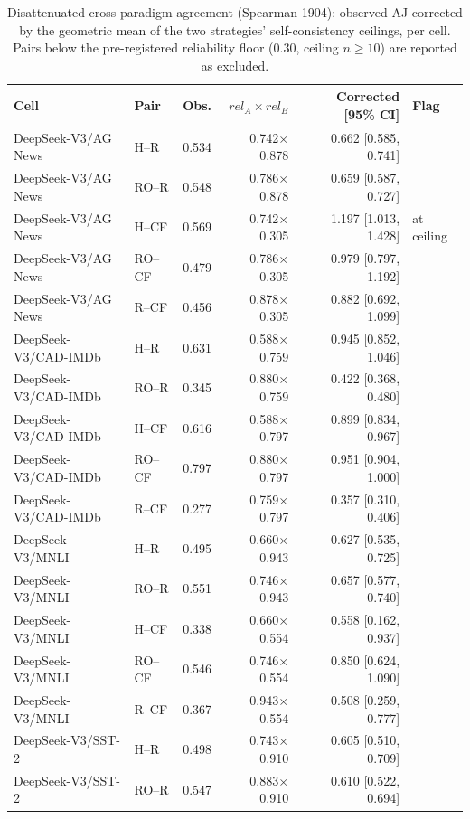 \begin{table}[t]
\centering
\footnotesize
\caption{Disattenuated cross-paradigm agreement (Spearman 1904): observed AJ corrected by the geometric mean of the two strategies' self-consistency ceilings, per cell. Pairs below the pre-registered reliability floor (0.30, ceiling $n \geq 10$) are reported as excluded.}
\label{tab:disattenuated}
\begin{tabular}{llrrrl}
\toprule
Cell & Pair & Obs. & $rel_A{\times}rel_B$ & Corrected [95\% CI] & Flag \\
\midrule
DeepSeek-V3/AG News & H--R & 0.534 & 0.742$\times$0.878 & 0.662 [0.585, 0.741] &  \\
DeepSeek-V3/AG News & RO--R & 0.548 & 0.786$\times$0.878 & 0.659 [0.587, 0.727] &  \\
DeepSeek-V3/AG News & H--CF & 0.569 & 0.742$\times$0.305 & 1.197 [1.013, 1.428] & at ceiling \\
DeepSeek-V3/AG News & RO--CF & 0.479 & 0.786$\times$0.305 & 0.979 [0.797, 1.192] &  \\
DeepSeek-V3/AG News & R--CF & 0.456 & 0.878$\times$0.305 & 0.882 [0.692, 1.099] &  \\
DeepSeek-V3/CAD-IMDb & H--R & 0.631 & 0.588$\times$0.759 & 0.945 [0.852, 1.046] &  \\
DeepSeek-V3/CAD-IMDb & RO--R & 0.345 & 0.880$\times$0.759 & 0.422 [0.368, 0.480] &  \\
DeepSeek-V3/CAD-IMDb & H--CF & 0.616 & 0.588$\times$0.797 & 0.899 [0.834, 0.967] &  \\
DeepSeek-V3/CAD-IMDb & RO--CF & 0.797 & 0.880$\times$0.797 & 0.951 [0.904, 1.000] &  \\
DeepSeek-V3/CAD-IMDb & R--CF & 0.277 & 0.759$\times$0.797 & 0.357 [0.310, 0.406] &  \\
DeepSeek-V3/MNLI & H--R & 0.495 & 0.660$\times$0.943 & 0.627 [0.535, 0.725] &  \\
DeepSeek-V3/MNLI & RO--R & 0.551 & 0.746$\times$0.943 & 0.657 [0.577, 0.740] &  \\
DeepSeek-V3/MNLI & H--CF & 0.338 & 0.660$\times$0.554 & 0.558 [0.162, 0.937] &  \\
DeepSeek-V3/MNLI & RO--CF & 0.546 & 0.746$\times$0.554 & 0.850 [0.624, 1.090] &  \\
DeepSeek-V3/MNLI & R--CF & 0.367 & 0.943$\times$0.554 & 0.508 [0.259, 0.777] &  \\
DeepSeek-V3/SST-2 & H--R & 0.498 & 0.743$\times$0.910 & 0.605 [0.510, 0.709] &  \\
DeepSeek-V3/SST-2 & RO--R & 0.547 & 0.883$\times$0.910 & 0.610 [0.522, 0.694] &  \\

\end{tabular}
\end{table}

